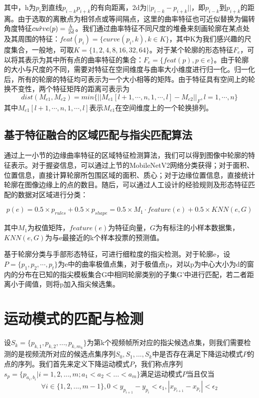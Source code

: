 其中，h为$p_i$到直线$p_{i-k}p_{i+k}$的有向距离，2d为$||p_{i-k}-p_{i+k}||$，即$p_{i-k}$到$p_{i+k}$的距离。由于选取的离散点为相邻点或等间隔点，这里的曲率特征也可近似替换为偏转角度特征$\hat{curve}(p)={h \over 2d}$。我们通过曲率特征不同尺度的堆叠来刻画轮廓在某点处及其周围的特征：$feat(p_i) = \{curve(p_i,k), k \in K\}$，其中K为我们感兴趣的尺度集合，一般地，可取$K=\{1, 2, 4, 8, 16, 32, 64\}$。对于某个轮廓的形态特征$F_e$，可以将其表示为其中所有点的曲率特征的集合：$F_e = \{feat(p), p \in e\}$。由于轮廓的大小与尺度的不同，需要对特征在空间维度与曲率大小维度进行归一化。归一化后，所有的轮廓的特征均可表示为一个大小相等的矩阵。由于特征具有空间上的轮换不变性，两个特征矩阵的距离可表示为
\begin{equation}
    dist(M_{e1}, M_{e2}) = min\{||M_{e1}[l+1,\cdots,n,1,\cdots,l]-M_{e2}||_F, l = 1,\cdots,n\}
\end{equation}
其中$M_{e1}[l+1,\cdots,n,1,\cdots,l]$表示$M_{e1}$在空间维度上的一个轮换排列。

\subsection{基于特征融合的区域匹配与指尖匹配算法}

通过上一小节的边缘曲率特征的区域特征检测算法，我们可以得到图像中轮廓的特征表示。对于握姿信息，可以通过上节的MobileNetV2网络分类获得；对于面积、位置信息，直接计算轮廓所包围区域的面积、质心；对于边缘位置信息，直接统计轮廓在图像边缘上的点的数目。随后，可以通过人工设计的经验规则及形态特征匹配的数据对区域进行分类：

\begin{equation}
    p(e) = 0.5\times p_{rules} + 0.5 \times p_{shape}=0.5 \times M_1 \cdot feature(e) + 0.5 \times KNN(e, G)
\end{equation}

其中$M_1$为权值矩阵，$feature(e)$为特征向量，$G$为有标注的小样本数据集，$KNN(e, G)$为与e最接近的k个样本投票的预测值。

基于轮廓分类与手部形态特征，可进行细粒度的指尖检测。对于轮廓e，设$P=\{p_1, p_2, \cdots, p_t\}$为e中的曲率极值点集，对于极值点p，对以p为中心大小为d的窗内的分布在已知的指尖模板集合G中相同轮廓类别的子集G'中进行匹配，若二者距离小于阈值，则将p加入指尖候选集。

\section{运动模式的匹配与检测}
\label{cha:motion}
设$S_k = \{p_{k,1}, p_{k,2}, ... , p_{k,m_k}\}$为第k个视频帧所对应的指尖候选点集，则我们需要检测的是视频流所对应的候选点集序列$S_0, S_1, ... , S_k$中是否存在满足下降运动模式$P$的点的序列。我们首先来定义下降运动模式$P$，我们称点序列$s_p=\{p_{a_i,b_i}|i=1,2,...,m; a_1 < a_2 < ... < a_m\}$满足运动模式$P$当且仅当$$\forall i \in \{1,2,...,m-1\}, 0 < y_{p_{i+1}} - y_{p_i} < \epsilon_1, |x_{p_{i+1}} - x_{p_i}| < \epsilon_2$$

